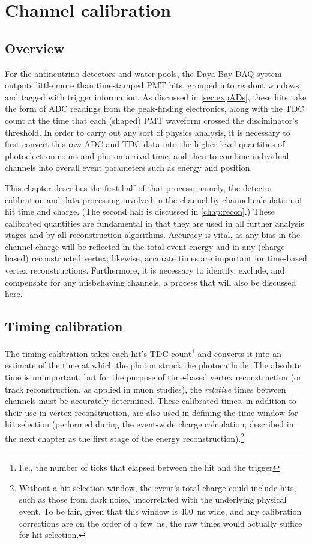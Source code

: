\documentclass[../thesis.tex]{subfiles}
\begin{document}
\chapter{Channel calibration}
\label{chap:calib}

\section{Overview}

For the antineutrino detectors and water pools, the Daya Bay DAQ system outputs
little more than timestamped PMT hits, grouped into readout windows and tagged
with trigger information. As discussed in \autoref{sec:expADs}, these hits take
the form of ADC readings from the peak-finding electronics, along with the TDC
count at the time that each (shaped) PMT waveform crossed the disciminator's
threshold. In order to carry out any sort of physics analysis, it is necessary
to first convert this raw ADC and TDC data into the higher-level quantities of
photoelectron count and photon arrival time, and then to combine individual
channels into overall event parameters such as energy and position.

This chapter describes the first half of that process; namely, the detector
calibration and data processing involved in the channel-by-channel calculation
of hit time and charge. (The second half is discussed in \autoref{chap:recon}.)
These calibrated quantities are fundamental in that they are used in all further
analysis stages and by all reconstruction algorithms. Accuracy is vital, as any
bias in the channel charge will be reflected in the total event energy and in
any (charge-based) reconstructed vertex; likewise, accurate times are important
for time-based vertex reconstructions. Furthermore, it is necessary to identify,
exclude, and compensate for any misbehaving channels, a process that will also
be discussed here.

\section{Timing calibration}

The timing calibration takes each hit's TDC count\footnote{I.e., the number of
  ticks that elapsed between the hit and the trigger} and converts it into an
estimate of the time at which the photon struck the photocathode. The absolute
time is unimportant, but for the purpose of time-based vertex reconstruction (or
track reconstruction, as applied in muon studies), the \emph{relative} times
between channels must be accurately determined. These calibrated times, in
addition to their use in vertex reconstruction, are also used in defining the
time window for hit selection (performed during the event-wide charge
calculation, described in the next chapter as the first stage of the energy
reconstruction).\footnote{Without a hit selection window, the event's total
  charge could include hits, such as those from dark noise, uncorrelated with
  the underlying physical event. To be fair, given that this window is 400~ns
  wide, and any calibration corrections are on the order of a few~ns, the raw
  times would actually suffice for hit selection.}
\end{document}
